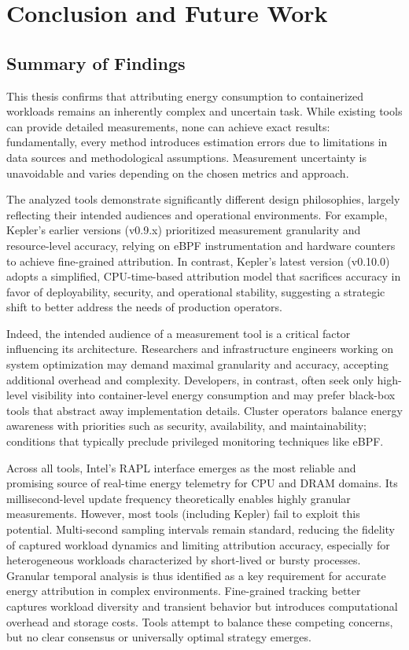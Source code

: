 \chapter{Conclusion and Future Work}

\section{Summary of Findings}

This thesis confirms that attributing energy consumption to containerized workloads remains an inherently complex and uncertain task. While existing tools can provide detailed measurements, none can achieve exact results: fundamentally, every method introduces estimation errors due to limitations in data sources and methodological assumptions. Measurement uncertainty is unavoidable and varies depending on the chosen metrics and approach.

The analyzed tools demonstrate significantly different design philosophies, largely reflecting their intended audiences and operational environments. For example, Kepler’s earlier versions (v0.9.x) prioritized measurement granularity and resource-level accuracy, relying on eBPF instrumentation and hardware counters to achieve fine-grained attribution. In contrast, Kepler’s latest version (v0.10.0) adopts a simplified, CPU-time-based attribution model that sacrifices accuracy in favor of deployability, security, and operational stability, suggesting a strategic shift to better address the needs of production operators.

Indeed, the intended audience of a measurement tool is a critical factor influencing its architecture. Researchers and infrastructure engineers working on system optimization may demand maximal granularity and accuracy, accepting additional overhead and complexity. Developers, in contrast, often seek only high-level visibility into container-level energy consumption and may prefer black-box tools that abstract away implementation details. Cluster operators balance energy awareness with priorities such as security, availability, and maintainability; conditions that typically preclude privileged monitoring techniques like eBPF.

Across all tools, Intel’s RAPL interface emerges as the most reliable and promising source of real-time energy telemetry for CPU and DRAM domains. Its millisecond-level update frequency theoretically enables highly granular measurements. However, most tools (including Kepler) fail to exploit this potential. Multi-second sampling intervals remain standard, reducing the fidelity of captured workload dynamics and limiting attribution accuracy, especially for heterogeneous workloads characterized by short-lived or bursty processes. Granular temporal analysis is thus identified as a key requirement for accurate energy attribution in complex environments. Fine-grained tracking better captures workload diversity and transient behavior but introduces computational overhead and storage costs. Tools attempt to balance these competing concerns, but no clear consensus or universally optimal strategy emerges.

